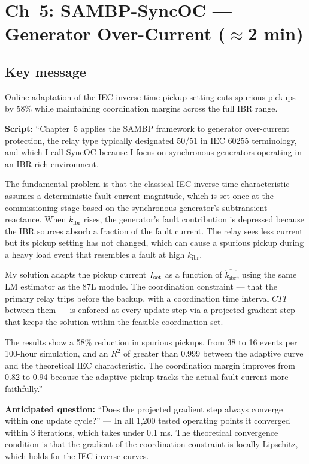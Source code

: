 \documentclass[11pt,a4paper]{article}
\newcommand{\script}[1]{\begin{scriptbox}\textbf{Script:} #1\end{scriptbox}}
\newcommand{\anticipate}[1]{\begin{warnbox}\textbf{Anticipated question:} #1\end{warnbox}}
\newcommand{\kibr}{k_{\mathrm{ibr}}}
\newcommand{\CTI}{\mathit{CTI}}
\begin{document}
\section{Ch~5: SAMBP-SyncOC --- Generator Over-Current \hfill\normalfont\small($\approx$2 min)}
\label{slide:oc}

\subsection*{Key message}
Online adaptation of the IEC inverse-time pickup setting cuts spurious pickups by 58\%
while maintaining coordination margins across the full IBR range.

\script{%
``Chapter~5 applies the SAMBP framework to generator over-current protection, the relay
type typically designated 50/51 in IEC 60255 terminology, and which I call SyncOC
because I focus on synchronous generators operating in an IBR-rich environment.

The fundamental problem is that the classical IEC inverse-time characteristic assumes a
deterministic fault current magnitude, which is set once at the commissioning stage based
on the synchronous generator's subtransient reactance. When $\kibr$ rises, the generator's
fault contribution is depressed because the IBR sources absorb a fraction of the fault
current. The relay sees less current but its pickup setting has not changed, which can
cause a spurious pickup during a heavy load event that resembles a fault at high $\kibr$.

My solution adapts the pickup current $I_{\rm set}$ as a function of $\hat{\kibr}$, using
the same LM estimator as the 87L module. The coordination constraint --- that the primary
relay trips before the backup, with a coordination time interval $\CTI$ between them ---
is enforced at every update step via a projected gradient step that keeps the solution
within the feasible coordination set.

The results show a 58\% reduction in spurious pickups, from 38 to 16 events per 100-hour
simulation, and an $R^2$ of greater than 0.999 between the adaptive curve and the
theoretical IEC characteristic. The coordination margin improves from 0.82 to 0.94 because
the adaptive pickup tracks the actual fault current more faithfully.''%
}

\anticipate{``Does the projected gradient step always converge within one update cycle?'' ---
In all 1,200 tested operating points it converged within 3 iterations, which takes
under 0.1 ms. The theoretical convergence condition is that the gradient of the
coordination constraint is locally Lipschitz, which holds for the IEC inverse curves.}
\end{document}
